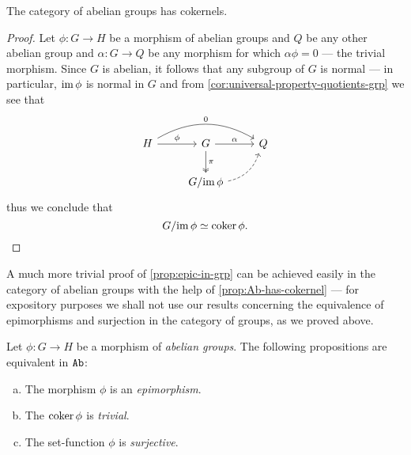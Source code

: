 \begin{proposition}[Cokernel in \(\Ab\)]
    \label{prop:Ab-has-cokernel}
    The category of abelian groups has cokernels.
\end{proposition}

\begin{proof}
    Let \(\phi: G \to H\) be a morphism of abelian groups and \(Q\) be any other
    abelian group and \(\alpha: G \to Q\) be any morphism for which
    \(\alpha \phi = 0\) --- the trivial morphism. Since \(G\) is abelian, it follows
    that any subgroup of \(G\) is normal --- in particular, \(\operatorname{im} \phi\) is normal
    in \(G\) and from \cref{cor:universal-property-quotients-grp} we see that
    \[
        \begin{tikzcd}
            H \ar[r, "\phi"] \ar[rr, bend left, "0"]
            &G \ar[r, "\alpha"] \ar[d, two heads, "\pi"]
            &Q \\
            &G/{\im \phi} \ar[ru, bend right, dashed]
        \end{tikzcd}
    \]
    thus we conclude that
    \[
        G/{\operatorname{im} \phi} \simeq \operatorname{coker} \phi.
    \]
\end{proof}

A much more trivial proof of \cref{prop:epic-in-grp} can be achieved easily in
the category of abelian groups with the help of \cref{prop:Ab-has-cokernel} ---
for expository purposes we shall not use our results concerning the equivalence
of epimorphisms and surjection in the category of groups, as we proved above.

\begin{proposition}
    \label{prop:epic-in-Ab}
    Let \(\phi: G \to H\) be a morphism of \emph{abelian groups}. The following
    propositions are equivalent in \(\Ab\):
    \begin{enumerate}[(a)]\setlength\itemsep{0em}
        \item The morphism \(\phi\) is an \emph{epimorphism}.

        \item The \(\operatorname{coker} \phi\) is \emph{trivial}.

        \item The set-function \(\phi\) is \emph{surjective}.
    \end{enumerate}
\end{proposition}

